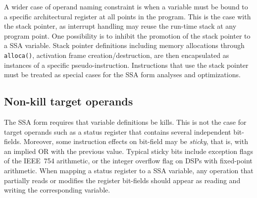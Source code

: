 A wider case of operand naming constraint is when a variable must be bound to a
specific architectural register at all points in the program. This is the case
with the stack pointer, as interrupt handling may reuse the run-time stack at
any program point.  One possibility is to inhibit the promotion of the stack
pointer to a SSA variable.  Stack pointer definitions including memory
allocations through \verb|alloca()|, activation frame creation/destruction, are
then encapsulated as instances of a specific pseudo-instruction. Instructions
that use the stack pointer must be treated as special cases for the SSA form
analyses and optimizations.

\subsection{Non-kill target operands} \label{sec:non-kill-target}

The SSA form requires that variable definitions be kills. This is not the case
for target operands such as a status register that contains several independent
bit-fields. Moreover, some instruction effects on bit-field may be \emph{sticky},
that is, with an implied OR with the previous value. Typical sticky bits include
exception flags of the IEEE~754 arithmetic, or the integer overflow flag on DSPs
with fixed-point arithmetic. When mapping a status register to a SSA variable,
any operation that partially reads or modifies the register bit-fields should
appear as reading and writing the corresponding variable.

